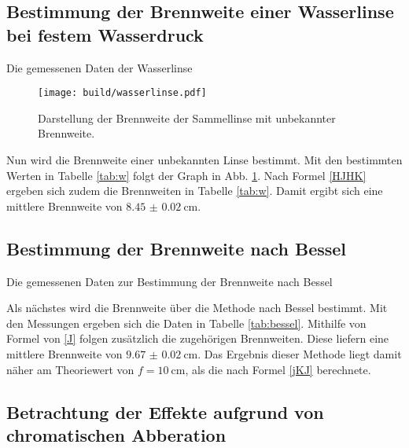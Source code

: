 \subsection{Bestimmung der Brennweite einer Wasserlinse bei festem Wasserdruck}

\begin{table}
	\centering
	\caption{Die gemessenen Daten der Wasserlinse}
	
	\label{tab:w}
\end{table}

\begin{figure}
 \centering
 \texttt{[image: build/wasserlinse.pdf]}
 \caption{Darstellung der Brennweite der Sammellinse mit unbekannter Brennweite.}
 \label{fig:water}
\end{figure}

Nun wird die Brennweite einer unbekannten Linse bestimmt. Mit den bestimmten Werten in Tabelle \ref{tab:w} folgt der Graph in Abb. \ref{fig:water}. Nach Formel \eqref{HJHK} ergeben sich zudem die Brennweiten in Tabelle \ref{tab:w}. Damit ergibt sich eine mittlere Brennweite von $\SI{8.45(2)}{\centi\meter}$.



\subsection{Bestimmung der Brennweite nach Bessel}

\begin{table}
	\centering
	\caption{Die gemessenen Daten zur Bestimmung der Brennweite nach Bessel}
	
	\label{tab:bessel}
\end{table}



 Als nächstes wird die Brennweite über die Methode nach Bessel bestimmt. Mit den Messungen ergeben sich die Daten in Tabelle \ref{tab:bessel}. Mithilfe von Formel von \eqref{J} folgen zusätzlich die zugehörigen Brennweiten. Diese liefern eine mittlere Brennweite von $\SI{9.67(2)}{\centi\meter}$. Das Ergebnis dieser Methode liegt damit näher am Theoriewert von $f = \SI{10}{\centi\meter}$, als die nach Formel \eqref{jKJ} berechnete.

 \subsection{Betrachtung der Effekte aufgrund von chromatischen Abberation}

